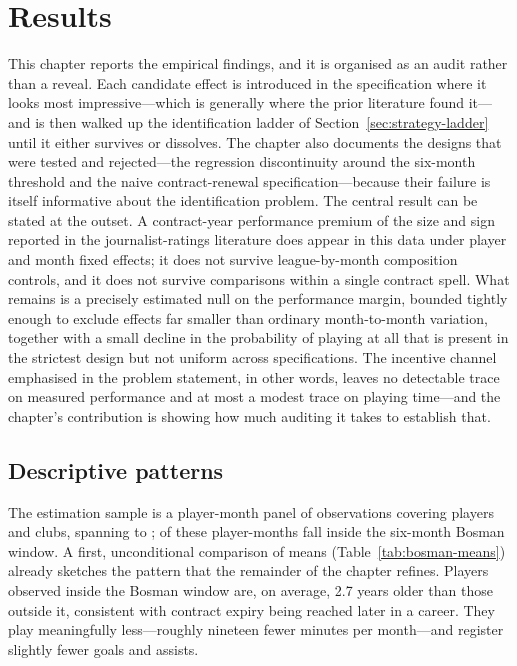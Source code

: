 \documentclass{article}
\begin{document}
\section{Results}
\label{sec:results}


This chapter reports the empirical findings, and it is organised as an
audit rather than a reveal. Each candidate effect is introduced in the
specification where it looks most impressive---which is generally where the
prior literature found it---and is then walked up the identification ladder
of Section~\ref{sec:strategy-ladder} until it either survives or dissolves.
The chapter also documents the designs that were tested and rejected---the
regression discontinuity around the six-month threshold and the naive
contract-renewal specification---because their failure is itself informative
about the identification problem. The central result can be stated at the
outset. A contract-year performance premium of the size and sign reported in
the journalist-ratings literature does appear in this data under player and
month fixed effects; it does not survive league-by-month composition
controls, and it does not survive comparisons within a single contract
spell. What remains is a precisely estimated null on the performance margin,
bounded tightly enough to exclude effects far smaller than ordinary
month-to-month variation, together with a small decline in the probability
of playing at all that is present in the strictest design but not uniform
across specifications. The incentive channel emphasised in the problem
statement, in other words, leaves no detectable trace on measured
performance and at most a modest trace on playing time---and the chapter's
contribution is showing how much auditing it takes to establish that.

\subsection{Descriptive patterns}
\label{sec:results-descriptive}

The estimation sample is a player-month panel of \NPanelObs{} observations
covering \NPanelPlayers{} players and \NPanelClubs{} clubs,
spanning \FirstMonth{} to \LastMonth{}; \NBosmanObs{} of these player-months fall inside
the six-month Bosman window. A first, unconditional comparison of means
(Table~\ref{tab:bosman-means}) already sketches the pattern that the remainder
of the chapter refines. Players observed inside the Bosman window are, on
average, 2.7 years older than those outside it, consistent with contract expiry
being reached later in a career. They play meaningfully less---roughly nineteen
fewer minutes per month---and register slightly fewer goals and assists.
\end{document}
